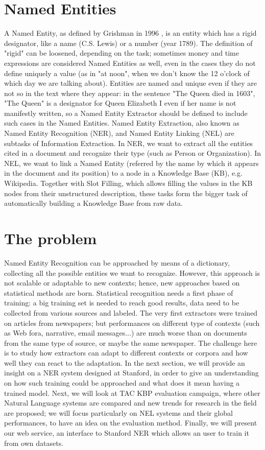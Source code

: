 \documentclass[a4paper,11pt]{report}
\begin{document}
\section{Named Entities}
A Named Entity, as defined by Grishman in 1996 \cite{grishman1996}, is an entity which has a rigid designator, like a name (C.S. Lewis) or a number (year 1789). The definition of "rigid" can be loosened, depending on the task; sometimes money and time expressions are considered Named Entities as well, even in the cases they do not define uniquely a value (as in "at noon", when we don't know the 12 o'clock of which day we are talking about). Entities are named and unique even if they are not so in the text where they appear: in the sentence "The Queen died in 1603", "The Queen" is a designator for Queen Elizabeth I even if her name is not manifestly written, so a Named Entity Extractor should be defined to include such cases in the Named Entities.
Named Entity Extraction, also known as Named Entity Recognition (NER), and Named Entity Linking (NEL) are subtasks of Information Extraction. In NER, we want to extract all the entities cited in a document and recognize their type (such as Person or Organization). In NEL, we want to link a Named Entity (referred by the name by which it appears in the document and its position) to a node in a Knowledge Base (KB), e.g. Wikipedia. Together with Slot Filling, which allows filling the values in the KB nodes from their unstructured description, these tasks form the bigger task of automatically building a Knowledge Base from raw data.
\section{The problem}
Named Entity Recognition can be approached by means of a dictionary, collecting all the possible entities we want to recognize. However, this approach is not scalable or adaptable to new contexts; hence, new approaches based on statistical methods are born. Statistical recognition needs a first phase of training: a big training set is needed to reach good results, data need to be collected from various sources and labeled. The very first extractors were trained on articles from newspapers; but performances on different type of contexts (such as Web fora, narrative, email messages...) are much worse than on documents from the same type of source, or maybe the same newspaper.
The challenge here is to study how extractors can adapt to different contexts or corpora and how well they can react to the adaptation. In the next section, we will provide an insight on a NER system designed at Stanford, in order to give an understanding on how such training could be approached and what does it mean having a trained model. Next, we will look at TAC KBP evaluation campaign, where other Natural Language systems are compared and new trends for research in the field are proposed; we will focus particularly on NEL systems and their global performances, to have an idea on the evaluation method. Finally, we will present our web service, an interface to Stanford NER which allows an user to train it from own datasets.
\end{document}
